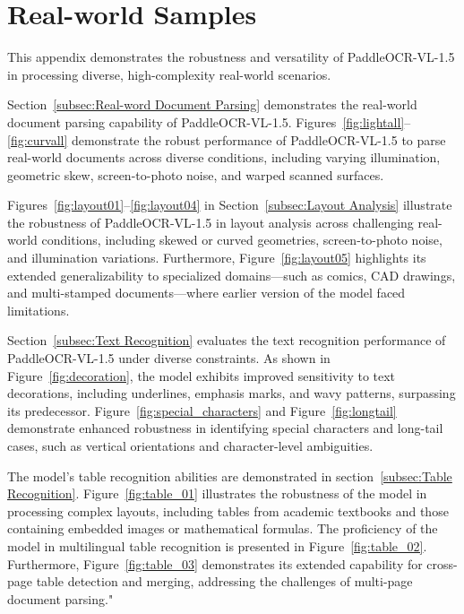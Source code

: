 \documentclass[11pt, a4paper,logo,  copyright, nonumbering]{paddleocr}
\begin{document}
\clearpage 
\newpage

\section{Real-world Samples}

This appendix demonstrates the robustness and versatility of PaddleOCR-VL-1.5 in processing diverse, high-complexity real-world scenarios.

Section~\ref{subsec:Real-word Document Parsing} demonstrates the real-world document parsing capability of PaddleOCR-VL-1.5. Figures~\ref{fig:lightall}--\ref{fig:curvall} demonstrate the robust performance of PaddleOCR-VL-1.5 to parse real-world documents across diverse conditions, including varying illumination, geometric skew, screen-to-photo noise, and warped scanned surfaces.

Figures~\ref{fig:layout01}--\ref{fig:layout04} in Section~\ref{subsec:Layout Analysis} illustrate the robustness of PaddleOCR-VL-1.5 in layout analysis across challenging real-world conditions, including skewed or curved geometries, screen-to-photo noise, and illumination variations. Furthermore, Figure~\ref{fig:layout05} highlights its extended generalizability to specialized domains—such as comics, CAD drawings, and multi-stamped documents—where earlier version of the model faced limitations.

Section~\ref{subsec:Text Recognition} evaluates the text recognition performance of PaddleOCR-VL-1.5 under diverse constraints. As shown in Figure~\ref{fig:decoration}, the model exhibits improved sensitivity to text decorations, including underlines, emphasis marks, and wavy patterns, surpassing its predecessor. Figure~\ref{fig:special_characters} and Figure~\ref{fig:longtail} demonstrate enhanced robustness in identifying special characters and long-tail cases, such as vertical orientations and character-level ambiguities.

The model's table recognition abilities are demonstrated in section~\ref{subsec:Table Recognition}. Figure~\ref{fig:table_01} illustrates the robustness of the model in processing complex layouts, including tables from academic textbooks and those containing embedded images or mathematical formulas. The proficiency of the model in multilingual table recognition is presented in Figure~\ref{fig:table_02}. Furthermore, Figure~\ref{fig:table_03} demonstrates its extended capability for cross-page table detection and merging, addressing the challenges of multi-page document parsing."
\end{document}
